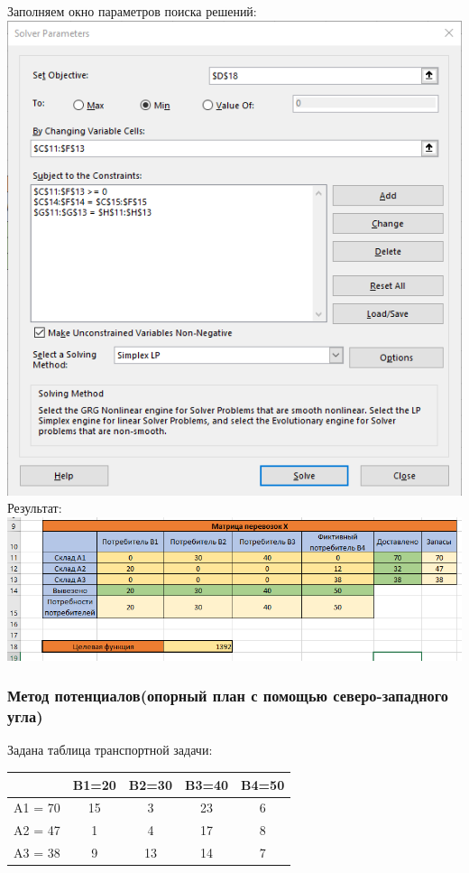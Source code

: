 \documentclass[a4paper, 12pt]{article}
\begin{document}
\newpage
Заполняем окно параметров поиска решений:\\

\includegraphics{2-4.png}\\

Результат: \\

\includegraphics[width=\textwidth]{2-5.png}\\
\subsubsection{Метод потенциалов(опорный план с помощью северо-западного угла)}

Задана таблица транспортной задачи:
\begin{table}[H]
\centering
\begin{tabular}{c|c|c|c|c|}
\cline{2-5}
                              & B1=20 & B2=30 & B3=40 & B4=50 \\ \hline
\multicolumn{1}{|c|}{A1 = 70} & 15    & 3     & 23    & 6     \\ \hline
\multicolumn{1}{|c|}{A2 = 47} & 1     & 4     & 17    & 8     \\ \hline
\multicolumn{1}{|c|}{A3 = 38} & 9     & 13    & 14    & 7     \\ \hline
\end{tabular}
\end{table}
\end{document}
